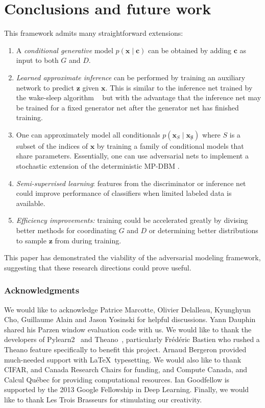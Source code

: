 \documentclass{article} %
\begin{document}
\section{Conclusions and future work}

This framework
admits many straightforward extensions:
\begin{enumerate}[noitemsep,leftmargin=0.4cm]
\item A {\em conditional generative} model $p(\bm{x} \mid \bm{c})$ can be obtained by adding $\bm{c}$
as input to both $G$ and $D$.
\item {\em Learned approximate inference} can be performed by training an auxiliary network to predict
    $\bm{z}$ given $\bm{x}$. This is similar to the inference net trained by the wake-sleep algorithm ~\citep{Hinton95}
but with the advantage that the inference net may be trained for a fixed generator net after the generator
net has finished training.
\item One can approximately model all conditionals $p(\bm{x}_S \mid \bm{x}_{\not S})$ where $S$ is a subset of
the indices of $\bm{x}$
by training a family of conditional models that share parameters. Essentially, one can use adversarial nets to implement
 a stochastic extension of the deterministic MP-DBM \cite{Goodfellow-et-al-NIPS2013-small}.
\item {\em Semi-supervised learning}: features from the discriminator or inference net could improve performance
of classifiers when limited labeled data is available.
\item {\em Efficiency improvements:} training could be accelerated greatly by divising better methods for
coordinating $G$ and $D$ or determining better distributions to sample $\mathbf{z}$ from during training.
\end{enumerate}
This paper has demonstrated the viability of the adversarial modeling framework, suggesting that these research
directions could prove useful.


\subsubsection*{Acknowledgments}
We would like to acknowledge Patrice Marcotte, Olivier Delalleau, Kyunghyun Cho, Guillaume Alain and Jason Yosinski for helpful discussions.
Yann Dauphin shared his Parzen window evaluation code with us.
We would like to thank the developers of
Pylearn2~\citep{pylearn2_arxiv_2013}
and
Theano~\citep{bergstra+al:2010-scipy,Bastien-Theano-2012}, particularly
Fr\'ed\'eric Bastien who rushed a Theano feature specifically to benefit this project.
Arnaud Bergeron provided much-needed support with \LaTeX\ typesetting.
We would also like to thank CIFAR, and Canada Research Chairs for funding, and Compute Canada, and Calcul Qu\'ebec
for providing computational resources. Ian Goodfellow is supported by the 2013 Google Fellowship in Deep
Learning. Finally, we would like to thank Les Trois Brasseurs for stimulating our creativity.



{\small

}
\end{document}
